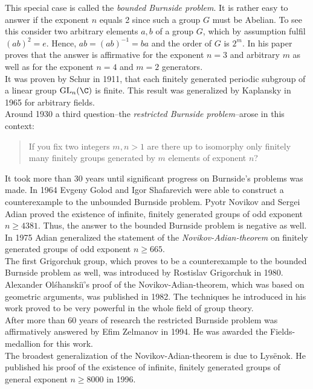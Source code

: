 This special case is called the \emph{bounded Burnside problem}. It is rather easy to answer if the exponent $n$ equals 2 since such a group $G$ must be Abelian. To see this consider two arbitrary elements $a,b$ of a group $G$, which by assumption fulfil $(ab)^2=e$. Hence, $ab=(ab)^{-1}=ba$ and the order of $G$ is $2^m$. In his paper \textcite{burnside1902} proves that the answer is affirmative for the exponent $n=3$ and arbitrary $m$ as well as for the exponent $n=4$ and $m=2$ generators.\\
It was proven by Schur in 1911, that each finitely generated periodic subgroup of a linear group $\mathrm{GL}_n(\C)$ is finite. This result was generalized by Kaplansky in 1965 for arbitrary fields.\\
Around 1930 a third question--the \emph{restricted Burnside problem}--arose in this context:
\begin{quotation}
If you fix two integers $m,n>1$ are there up to isomorphy only finitely many finitely groups generated by $m$ elements of exponent $n$?
\end{quotation}
It took more than 30 years until significant progress on Burnside's problems was made. In 1964 Evgeny Golod and Igor Shafarevich were able to construct a counterexample to the unbounded Burnside problem. Pyotr Novikov and Sergei Adian proved the existence of infinite, finitely generated groups of odd exponent $n\geq 4381$. Thus, the answer to the bounded Burnside problem is negative as well. In 1975 Adian generalized the statement of the \emph{Novikov-Adian-theorem} on finitely generated groups of odd exponent $n\geq 665$.\\
The first Grigorchuk group, which proves to be a counterexample to the bounded Burnside problem as well, was introduced by Rostislav Grigorchuk in 1980.\\
Alexander Ol\'{s}hanski\u{i}'s proof of the Novikov-Adian-theorem, which was based on geometric arguments, was published in 1982. The techniques he introduced in his work proved to be very powerful in the whole field of group theory.\\
After more than 60 years of research the restricted Burnside problem was affirmatively answered by Efim Zelmanov in 1994. He was awarded the Fields-medallion for this work.\\
The broadest generalization of the Novikov-Adian-theorem is due to Lys\"{e}nok. He published his proof of the existence of infinite, finitely generated groups of general exponent $n\geq 8000$ in 1996.